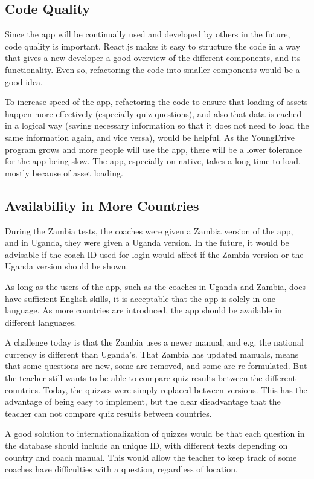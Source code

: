 \subsection{Code Quality}
Since the app will be continually used and developed by others in the future, code quality is important. React.js makes it easy to structure the code in a way that gives a new developer a good overview of the different components, and its functionality. Even so, refactoring the code into smaller components would be a good idea.

To increase speed of the app, refactoring the code to ensure that loading of assets happen more effectively (especially quiz questions), and also that data is cached in a logical way (saving necessary information so that it does not need to load the same information again, and vice versa), would be helpful. As the YoungDrive program grows and more people will use the app, there will be a lower tolerance for the app being slow. The app, especially on native, takes a long time to load, mostly because of asset loading.

\subsection{Availability in More Countries}\label{sec:internationalization}
During the Zambia tests, the coaches were given a Zambia version of the app, and in Uganda, they were given a Uganda version. In the future, it would be advisable if the coach ID used for login would affect if the Zambia version or the Uganda version should be shown.

As long as the users of the app, such as the coaches in Uganda and Zambia, does have sufficient English skills, it is acceptable that the app is solely in one language. As more countries are introduced, the app should be available in different languages.

A challenge today is that the Zambia uses a newer manual, and e.g. the national currency is different than Uganda's. That Zambia has updated manuals, means that some questions are new, some are removed, and some are re-formulated. But the teacher still wants to be able to compare quiz results between the different countries. Today, the quizzes were simply replaced between versions. This has the advantage of being easy to implement, but the clear disadvantage that the teacher can not compare quiz results between countries.

A good solution to internationalization of quizzes would be that each question in the database should include an unique ID, with different texts depending on country and coach manual. This would allow the teacher to keep track of some coaches have difficulties with a question, regardless of location.

